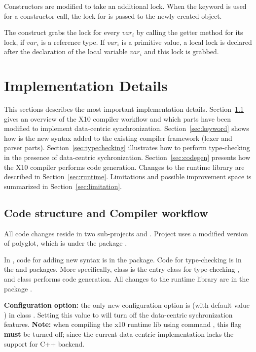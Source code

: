 \documentclass{article}
\begin{document}
Constructors are modified to take an additional lock. When the  keyword is used for a constructor call, the lock for  is passed to the newly created object.

The construct  grabs the lock for every $var_i$ by calling the getter method for its lock, if $var_i$ is a reference type.
If $var_i$ is a primitive value, a local lock is declared after the declaration of the local variable $var_i$ and this lock is grabbed.

\section{Implementation Details}
\label{sec:details}

This sections describes the most important implementation details. Section~\ref{sec:code} gives an overview of the X10 compiler workflow and which parts  have been modified to implement data-centric synchronization. Section~\ref{sec:keyword} shows how is the new syntax added to the existing compiler framework (lexer and parser parts). Section~\ref{sec:typechecking} illustrates how to perform type-checking in the presence of data-centric sychronization. Section~\ref{sec:codegen} presents how the X10 compiler performs code generation. Changes to the runtime library are described in Section~\ref{sec:runtime}. Limitations and possible improvement space is summarized in Section~\ref{sec:limitation}.

\subsection{Code structure and Compiler workflow}
\label{sec:code}

All code changes reside in two sub-projects  and
. Project  uses a modified version of polyglot, which is under the package .

In ,  code for adding new syntax  is in the  package. Code for type-checking is in the  and  packages. More specifically, class  is the entry class for type-checking , and class  performs  code generation. All changes to the runtime library are in the package . 

\textbf{Configuration option: } the only new configuration option is  (with default value ) in class . Setting this value to  will turn off the data-centric sychronization features. \textbf{Note:} when compiling the x10 runtime lib using command , this flag \textbf{must} be turned off; since the current data-centric implementation lacks the support for C++ backend.
\end{document}
